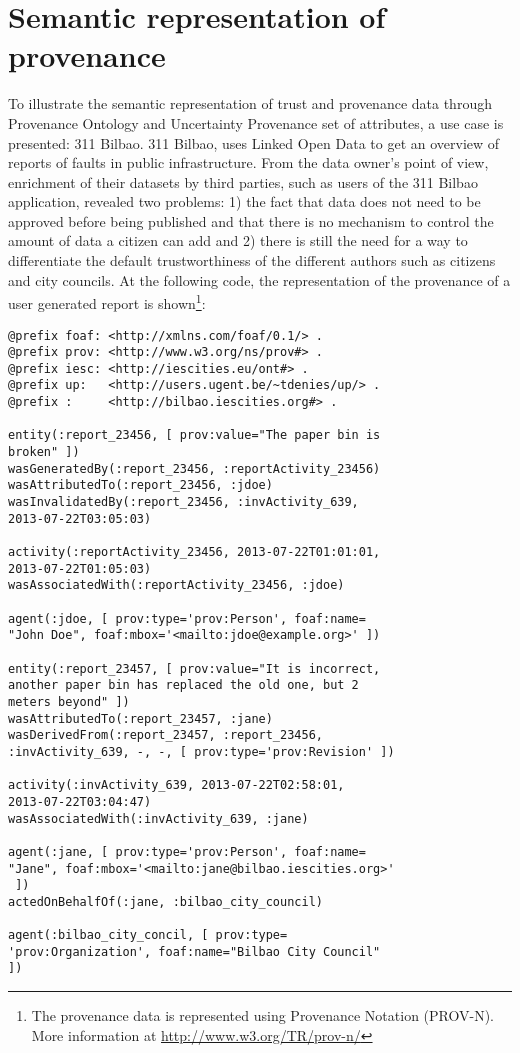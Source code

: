 \section{Semantic representation of provenance}
\label{sec:use_cases}

To illustrate the semantic representation of trust and provenance data through Provenance Ontology and Uncertainty Provenance set of attributes, a use case is presented: 311 Bilbao. 311 Bilbao, uses Linked Open Data to get an overview of reports of faults in public infrastructure. From the data owner’s point of view, enrichment of their datasets by third parties, such as users of the 311 Bilbao application, revealed two problems: 1) the fact that data does not need to be approved before being published and that there is no mechanism to control the amount of data a citizen can add and 2) there is still the need for a way to differentiate the default trustworthiness of the different authors such as citizens and city councils. At the following code, the representation of the provenance of a user generated report is shown\footnote{The provenance data is represented using Provenance Notation (PROV-N). More information at \url{http://www.w3.org/TR/prov-n/}}:

\lstset{numbers=left, basicstyle=\ttfamily\scriptsize,}
\begin{lstlisting}
@prefix foaf: <http://xmlns.com/foaf/0.1/> .
@prefix prov: <http://www.w3.org/ns/prov#> .
@prefix iesc: <http://iescities.eu/ont#> .
@prefix up:   <http://users.ugent.be/~tdenies/up/> .
@prefix :     <http://bilbao.iescities.org#> .

entity(:report_23456, [ prov:value="The paper bin is 
broken" ])
wasGeneratedBy(:report_23456, :reportActivity_23456)
wasAttributedTo(:report_23456, :jdoe)
wasInvalidatedBy(:report_23456, :invActivity_639, 
2013-07-22T03:05:03)

activity(:reportActivity_23456, 2013-07-22T01:01:01, 
2013-07-22T01:05:03)
wasAssociatedWith(:reportActivity_23456, :jdoe)

agent(:jdoe, [ prov:type='prov:Person', foaf:name=
"John Doe", foaf:mbox='<mailto:jdoe@example.org>' ])

entity(:report_23457, [ prov:value="It is incorrect, 
another paper bin has replaced the old one, but 2 
meters beyond" ])
wasAttributedTo(:report_23457, :jane)
wasDerivedFrom(:report_23457, :report_23456, 
:invActivity_639, -, -, [ prov:type='prov:Revision' ])

activity(:invActivity_639, 2013-07-22T02:58:01, 
2013-07-22T03:04:47)
wasAssociatedWith(:invActivity_639, :jane)

agent(:jane, [ prov:type='prov:Person', foaf:name=
"Jane", foaf:mbox='<mailto:jane@bilbao.iescities.org>'
 ])
actedOnBehalfOf(:jane, :bilbao_city_council)

agent(:bilbao_city_concil, [ prov:type=
'prov:Organization', foaf:name="Bilbao City Council" 
])

\end{lstlisting}


